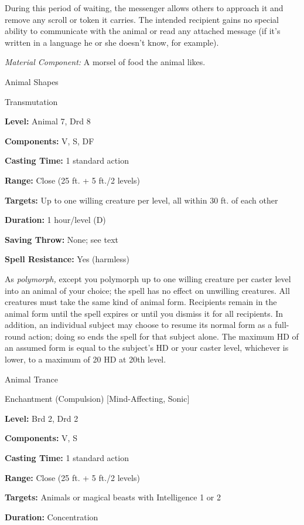 \documentclass{article}
\begin{document}
During this period of waiting, the messenger allows others to approach it and remove 
any scroll or token it carries. The intended recipient gains no special ability 
to communicate with the animal or read any attached message (if it's written in 
a language he or she doesn't know, for example).

\textit{Material Component: }A morsel of food the animal likes.

\vspace{12pt}
Animal Shapes

Transmutation

\textbf{Level:} Animal 7, Drd 8

\textbf{Components:} V, S, DF

\textbf{Casting Time:} 1 standard action

\textbf{Range:} Close (25 ft. + 5 ft./2 levels)

\textbf{Targets:} Up to one willing creature per level, all within 30 ft. of each 
other

\textbf{Duration:} 1 hour/level (D)

\textbf{Saving Throw:} None; see text

\textbf{Spell Resistance:} Yes (harmless)

As \textit{polymorph, }except you polymorph up to one willing creature per caster 
level into an animal of your choice; the spell has no effect on unwilling creatures. 
All creatures must take the same kind of animal form. Recipients remain in the 
animal form until the spell expires or until you dismiss it for all recipients. 
In addition, an individual subject may choose to resume its normal form as a full-round 
action; doing so ends the spell for that subject alone. The maximum HD of an assumed 
form is equal to the subject's HD or your caster level, whichever is lower, to 
a maximum of 20 HD at 20th level.

\vspace{12pt}
Animal Trance

Enchantment (Compulsion) [Mind-Affecting, Sonic]

\textbf{Level:} Brd 2, Drd 2

\textbf{Components:} V, S

\textbf{Casting Time:} 1 standard action

\textbf{Range:} Close (25 ft. + 5 ft./2 levels)

\textbf{Targets:} Animals or magical beasts with Intelligence 1 or 2

\textbf{Duration:} Concentration
\end{document}
